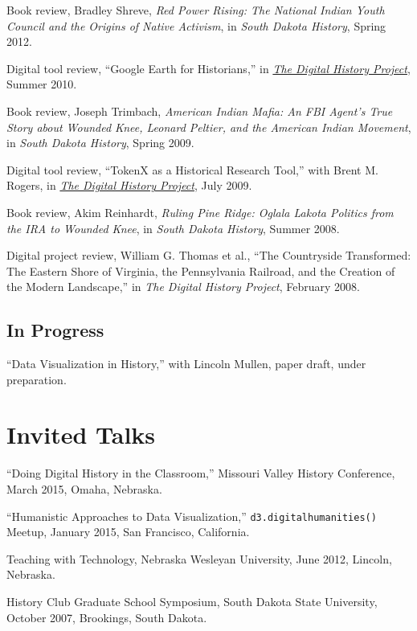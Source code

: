 Book review, Bradley Shreve, \emph{Red Power Rising: The National Indian
Youth Council and the Origins of Native Activism}, in \emph{South Dakota
History}, Spring 2012.

Digital tool review, ``Google Earth for Historians,'' in
\emph{\href{http://digitalhistory.unl.edu/t-reviews/geheppler.php}{The
Digital History Project}}, Summer 2010.

Book review, Joseph Trimbach, \emph{American Indian Mafia: An FBI
Agent's True Story about Wounded Knee, Leonard Peltier, and the American
Indian Movement}, in \emph{South Dakota History}, Spring 2009.

Digital tool review, ``TokenX as a Historical Research Tool,'' with
Brent M. Rogers, in
\emph{\href{http://digitalhistory.unl.edu/t-reviews/tokenxhepplerrogers.php}{The
Digital History Project}}, July 2009.

Book review, Akim Reinhardt, \emph{Ruling Pine Ridge: Oglala Lakota
Politics from the IRA to Wounded Knee}, in \emph{South Dakota History},
Summer 2008.

Digital project review, William G. Thomas et al., ``The Countryside
Transformed: The Eastern Shore of Virginia, the Pennsylvania Railroad,
and the Creation of the Modern Landscape,'' in \emph{The Digital History
Project}, February 2008.

\subsection{In Progress}\label{in-progress}

``Data Visualization in History,'' with Lincoln Mullen, paper draft,
under preparation.

\section{Invited Talks}\label{invited-talks}

``Doing Digital History in the Classroom,'' Missouri Valley History
Conference, March 2015, Omaha, Nebraska.

``Humanistic Approaches to Data Visualization,''
\texttt{d3.digitalhumanities()} Meetup, January 2015, San Francisco,
California.

Teaching with Technology, Nebraska Wesleyan University, June 2012,
Lincoln, Nebraska.

History Club Graduate School Symposium, South Dakota State University,
October 2007, Brookings, South Dakota.

